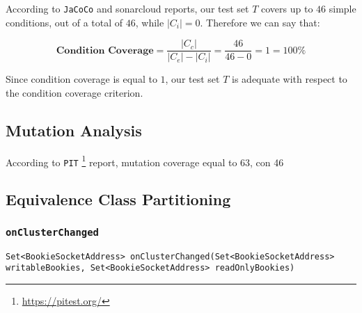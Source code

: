 \documentclass[sigconf]{acmart}
\newcommand{\abs}[1]{\left|#1\right|}
\begin{document}
According to \texttt{JaCoCo} and sonarcloud reports, our test set $T$ covers up to $46$ simple conditions, out of a total of $46$, while $\abs{C_i} = 0$. Therefore we can say that:

\begin{equation} 
\textbf{Condition Coverage} = \dfrac{\abs{C_c}}{\abs{C_e} - \abs{C_i}} = \dfrac{46}{46-0} = 1 = 100\%
\end{equation}

Since condition coverage is equal to $1$, our test set $T$ is adequate with respect to the condition coverage criterion. 


\subsection{Mutation Analysis}


According to \texttt{PIT} \footnote{\url{https://pitest.org/}} report, mutation coverage equal to 63, con 46 




\subsection{Equivalence Class Partitioning}

\subsubsection{\texttt{onClusterChanged}}

\begin{lstlisting}[frame=lines, caption={\texttt{onClusterChanged} method signature.}]
Set<BookieSocketAddress> onClusterChanged(Set<BookieSocketAddress> writableBookies, Set<BookieSocketAddress> readOnlyBookies)
\end{lstlisting}
\end{document}
